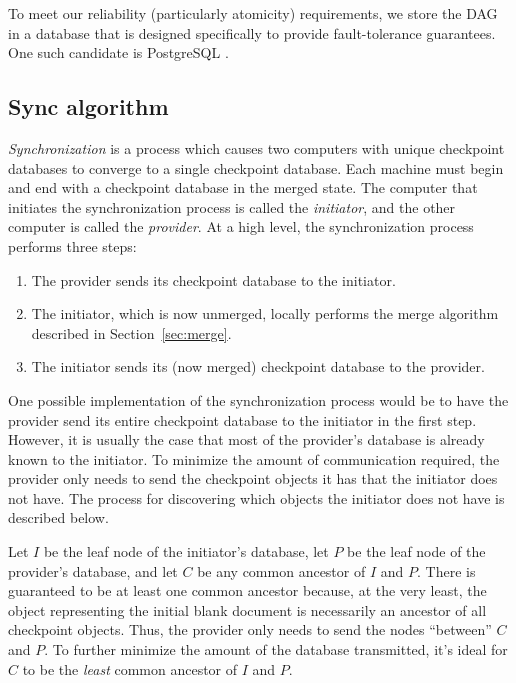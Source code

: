 \documentclass[11pt,titlepage]{article}
\begin{document}
To meet our reliability (particularly atomicity) requirements, we
store the DAG in a database that is designed specifically to provide
fault-tolerance guarantees.  One such candidate is PostgreSQL
\cite{postgres}.

\subsection{Sync algorithm}

\emph{Synchronization} is a process which causes two computers with 
unique checkpoint databases to converge to a single checkpoint database. 
Each machine must begin and end with a checkpoint database in the merged 
state. The computer that initiates the synchronization
process is called the \emph{initiator}, and the other computer is
called the \emph{provider}. At a high level, the synchronization
process performs three steps:
\begin{enumerate}
\item The provider sends its checkpoint database to the initiator.
\item The initiator, which is now unmerged, locally performs the merge
  algorithm described in Section~\ref{sec:merge}.
\item The initiator sends its (now merged) checkpoint database to the
  provider.
\end{enumerate}
One possible implementation of the synchronization process would be to
have the provider send its entire checkpoint database to the initiator
in the first step. However, it is usually the case that most of the
provider's database is already known to the initiator. To minimize the
amount of communication required, the provider only needs to send the
checkpoint objects it has that the initiator does not have. The process 
for discovering which objects the initiator does not have is described 
below.

Let $I$ be the leaf node of the initiator's database, let $P$ be the
leaf node of the provider's database, and let $C$ be any common
ancestor of $I$ and $P$. There is guaranteed to be at least one common
ancestor because, at the very least, the object representing the
initial blank document is necessarily an ancestor of all checkpoint
objects. Thus, the provider only needs to send the nodes ``between''
$C$ and $P$. To further minimize the amount of the database
transmitted, it's ideal for $C$ to be the \emph{least} common ancestor
of $I$ and $P$.
\end{document}
